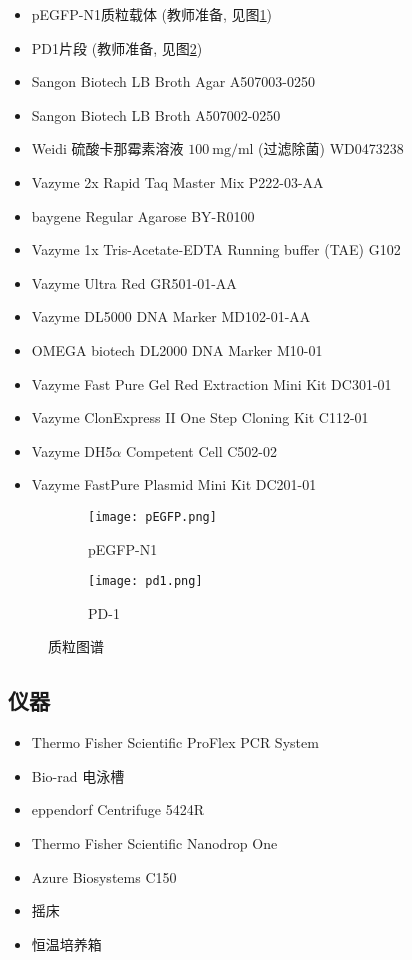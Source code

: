 \documentclass{article}
\begin{document}
\begin{itemize}
    \item pEGFP-N1质粒载体 (教师准备, 见图\ref{fig:pEGFP})
    \item PD1片段 (教师准备, 见图\ref{fig:pd1})
    \item Sangon Biotech LB Broth Agar A507003-0250
    \item Sangon Biotech LB Broth A507002-0250
    \item Weidi 硫酸卡那霉素溶液 $100\ \mbox{mg/ml}$ (过滤除菌) WD0473238
    \item Vazyme 2x Rapid Taq Master Mix P222-03-AA
    \item baygene Regular Agarose BY-R0100
    \item Vazyme 1x Tris-Acetate-EDTA Running buffer (TAE) G102
    \item Vazyme Ultra Red GR501-01-AA
    \item Vazyme DL5000 DNA Marker MD102-01-AA
    \item OMEGA biotech DL2000 DNA Marker M10-01
    \item Vazyme Fast Pure Gel Red Extraction Mini Kit DC301-01
    \item Vazyme ClonExpress II One Step Cloning Kit C112-01
    \item Vazyme DH5$\alpha$ Competent Cell C502-02
    \item Vazyme FastPure Plasmid Mini Kit DC201-01
\end{itemize}

\begin{figure}
    \centering
    \begin{subfigure}[b]{0.8\textwidth}
      \texttt{[image: pEGFP.png]}
      \caption{pEGFP-N1}
      \label{fig:pEGFP}
    \end{subfigure}
    \vspace{0.5cm}
    \begin{subfigure}[b]{1.0\textwidth}
      \texttt{[image: pd1.png]}
      \caption{PD-1}
      \label{fig:pd1}
    \end{subfigure}
    \caption{质粒图谱}
    \label{fig:plasmid}
\end{figure}

\subsection{仪器}

\begin{itemize}
    \item Thermo Fisher Scientific ProFlex PCR System
    \item Bio-rad 电泳槽
    \item eppendorf Centrifuge 5424R
    \item Thermo Fisher Scientific Nanodrop One
    \item Azure Biosystems C150
    \item 摇床
    \item 恒温培养箱
\end{itemize}
\end{document}

